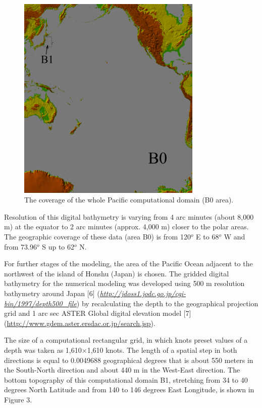 \documentclass{aip-cp}
\begin{document}
\begin{figure}[h]
  \centerline{\includegraphics[width=250pt]{art/Fig_02.png}}
  \caption{The coverage of the whole Pacific computational domain (B0 area).}
\end{figure}

Resolution of this digital bathymetry is varying from 4 arc minutes (about 
8,000 m) at the equator to 2 arc minutes (approx. 4,000 m) closer to the 
polar areas. The geographic coverage of these data (area B0) is from 
120$^{o}$ E to 68$^{o}$ W and from 73.96$^{o}$ S up to 62$^{o}$ N.

For further stages of the modeling, the area of the Pacific Ocean adjacent 
to the northwest of the island of Honshu (Japan) is chosen. The gridded 
digital bathymetry for the numerical modeling was developed using 500 m 
resolution bathymetry around Japan [6] (\underline 
{\textit{http://jdoss1.jodc.go.jp/cgi-bin/1997/depth500{\_}file}}) by 
recalculating the depth to the geographical projection grid and 1 
arc sec ASTER Global digital elevation model [7] (\underline 
{http://www.gdem.aster.ersdac.or.jp/search.jsp}).

The size of a computational rectangular grid, in which knots preset values 
of a depth was taken as 1,610$\times$1,610 knots. The length of a spatial step in 
both directions is equal to 0.0049688 geographical degrees that is about 550 
meters in the South-North direction and about 440 m in the West-East 
direction. The bottom topography of this computational domain B1, stretching 
from 34 to 40 degrees North Latitude and from 140 to 146 degrees East 
Longitude, is shown in Figure 3.
\end{document}
